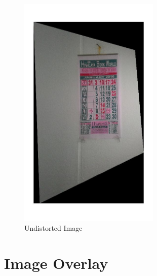 \documentclass[12pt]{article}
\begin{document}
\begin{figure}[htp]
\centering
\includegraphics[width=0.6\textwidth]{distortionCorrect.jpg}\hfill
\caption{Undistorted Image}
\end{figure}

\clearpage
\section{Image Overlay}
\end{document}
